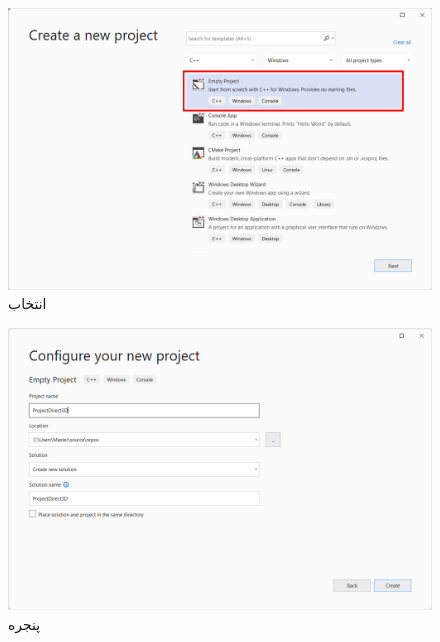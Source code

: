 {\begin{spacing}{1.5}
        \begin{figure}[H]
            \centering
            \setlength{\belowcaptionskip}{-10pt}
            \includegraphics[width=\textwidth]{Images/3/3.Intro.5.3}
            \caption{انتخاب }
            \label{fig:3.Intro.5.3}
        \end{figure}

        \begin{figure}[H]
            \centering
            \setlength{\belowcaptionskip}{-10pt}
            \includegraphics[width=\textwidth]{Images/3/3.Intro.5.4}
            \caption{پنجره }
            \label{fig:3.Intro.5.4}
        \end{figure}


\end{spacing}}
